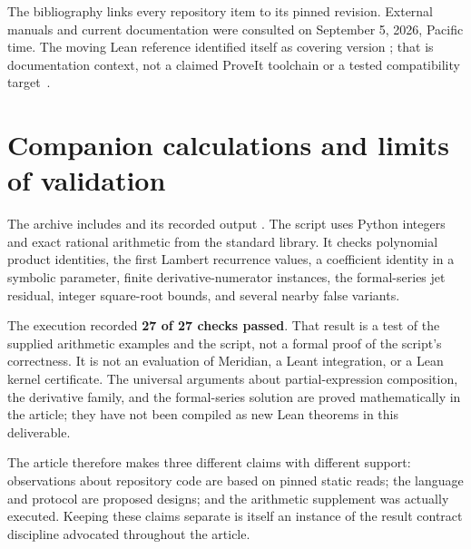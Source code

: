 \documentclass[11pt,a4paper]{article}
\newcommand{\code}[1]{\texttt{\detokenize{#1}}}
\theoremstyle{remark}
\begin{document}
The bibliography links every repository item to its pinned revision. External
manuals and current documentation were consulted on September 5, 2026, Pacific
time. The moving Lean reference identified itself as covering version
\code{4.34.0-rc2}; that is documentation context, not a claimed ProveIt toolchain
or a tested compatibility target~\cite{leanintro}.

\section{Companion calculations and limits of validation}
\label{app:checks}
The archive includes  and its recorded output
. The script uses Python integers and exact rational
arithmetic from the standard library. It checks polynomial product identities,
the first Lambert recurrence values, a coefficient identity in a symbolic
parameter, finite derivative-numerator instances, the formal-series jet residual,
integer square-root bounds, and several nearby false variants.

The execution recorded \textbf{27 of 27 checks passed}. That result is a test of
the supplied arithmetic examples and the script, not a formal proof of the
script's correctness. It is not an evaluation of Meridian, a Leant integration,
or a Lean kernel certificate. The universal arguments about partial-expression
composition, the derivative family, and the formal-series solution are proved
mathematically in the article; they have not been compiled as new Lean theorems
in this deliverable.

The article therefore makes three different claims with different support:
observations about repository code are based on pinned static reads; the language
and protocol are proposed designs; and the arithmetic supplement was actually
executed. Keeping these claims separate is itself an instance of the result
contract discipline advocated throughout the article.
\end{document}
